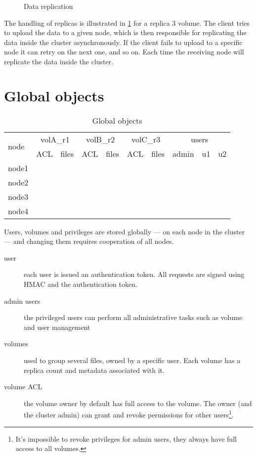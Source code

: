 \begin{figure}
	\centering
	
	\caption{Data replication}
	\label{fig:replication}
\end{figure}

The handling of replicas is illustrated in
{\ifpdf{}\else\ref{fig:replication}\fi} for
a replica 3 volume. The client tries to upload the data to a given node,
which is then responsible for replicating the data inside the cluster
asynchronously. If the client fails to upload to a specific node it can
retry on the next one, and so on. Each time the receiving node will
replicate the data inside the cluster.

\section{Global objects}
\newcommand{\col}[1]{#1}
\begin{table}
	\centering
	\begin{tabular}{lccccccccc}
		\hline
		\multirow{2}{*}{node} & \multicolumn{2}{c}{volA\_r1} & \multicolumn{2}{c}{volB\_r2} & \multicolumn{2}{c}{volC\_r3} & \multicolumn{3}{c}{users} \\
		& \col{ACL} & \col{files} & \col{ACL} & \col{files} & \col{ACL} & \col{files} & admin & u1 & u2 \\
		\hline
		node1 & \cmark & \cmark & \cmark & \xmark & \cmark &  \xmark  & \cmark & \cmark & \cmark \\
		node2 & \cmark & \xmark & \cmark &  \cmark & \cmark & \cmark & \cmark & \cmark & \cmark \\
		node3 & \cmark & \xmark & \cmark & \cmark & \cmark & \cmark & \cmark & \cmark & \cmark \\
		node4 & \cmark & \xmark & \cmark & \xmark & \cmark &  \cmark & \cmark & \cmark & \cmark \\ 
		\hline
	\end{tabular}
	\caption{Global objects}
	\label{tab:globals}
\end{table}

Users, volumes and privileges are stored globally --- on each node in the
cluster --- and changing them requires cooperation of all nodes.

\begin{description}
\item[user] each user is issued an authentication token. All requests are
    signed using HMAC and the authentication token.
\item[admin users] the privileged users can perform all administrative tasks
    such as volume and user management
\item[volumes] used to group several files, owned by a specific user. Each
    volume has a replica count and metadata associated with it.
\item[volume ACL] the volume owner by default has full access to the volume.
    The owner (and the cluster admin) can grant and revoke permissions for
    other users\footnote{It's impossible to revoke privileges for admin users,
    they always have full access to all volumes.}.
\end{description}

